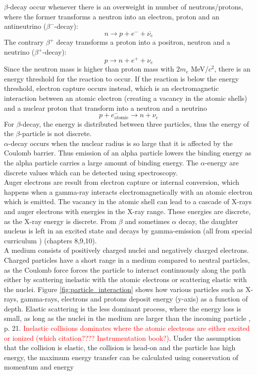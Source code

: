 $\beta$-decay occur whenever there is an overweight in number of neutrons/protons, where the former transforms a neutron into an electron, proton and an antineutrino ($\beta^-$-decay): $$n\rightarrow p+e^-+ \overline{\nu_e}$$ The contrary $\beta^+$ decay transforms a proton into a positron, neutron and a neutrino ($\beta^+$-decay): $$p \rightarrow n+e^+ +\nu_e$$ Since the neutron mass is higher than proton mass with $2m_e$ MeV/$c^2$, there is an energy threshold for the reaction to occur. If the reaction is below the energy threshold, electron capture occurs instead, which is an electromagnetic interaction between an atomic electron (creating a vacancy in the atomic shells) and a nuclear proton that transform into a neutron and a neutrino $$p+e^-_\text{atomic}\rightarrow n+ \nu_e$$ For $\beta$-decay, the energy is distributed between three particles, thus the energy of the $\beta$-particle is not discrete.   \\
$\alpha$-decay occurs when the nuclear radius is so large that it is affected by the Coulomb barrier. Thus emission of an alpha particle lowers the binding energy as the alpha particle carries a large amount of binding energy. The $\alpha$-energy are discrete values which can be detected using spectroscopy. \\
Auger electrons are result from electron capture or internal conversion, which happens when a gamma-ray interacts electromagnetically with an atomic electron which is emitted. The vacancy in the atomic shell can lead to a cascade of X-rays and auger electrons with energies in the X-ray range. These energies are discrete, as the X-ray energy is discrete. From $\beta$ and sometimes $\alpha$ decay, the daughter nucleus is left in an excited state and decays by gamma-emission (all from special curriculum \cite{Ekeberg2020}) \cite{KraneKennethS.Halliday1987} (chapters 8,9,10).  \\

\noindent A medium consists of positively charged nuclei and negatively charged electrons. Charged particles have a short range in a medium compared to neutral particles, as the Coulomb force forces the particle to interact continuously along the path either by scattering inelastic with the atomic electrons or scattering elastic with the nuclei. Figure \ref{fig:particle_interaction} shows how various particles such as X-rays, gamma-rays, electrons and protons deposit energy (y-axis) as a function of depth. Elastic scattering is the less dominant process, where the energy loss is small, as long as the nuclei in the medium are larger than the incoming particle \cite{Leo1994}, p. 21.  \textcolor{red}{Inelastic collisions dominates where the atomic electrons are either excited or ionized (which citation???? Instrumentation book?)}. Under the assumption that the collision is elastic, the collision is head-on and the particle has high energy, the maximum energy transfer can be calculated using conservation of momentum and energy

